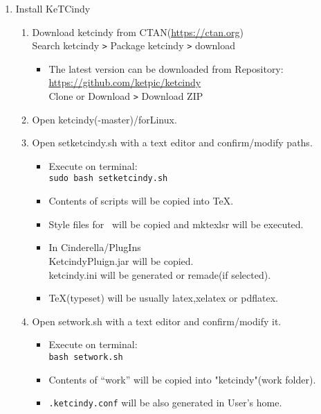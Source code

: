 \documentclass{article}
\begin{document}
\begin{enumerate}[\bf\large 1.]
\item Install KeTCindy
  \begin{enumerate}[(1)]
  \item Download ketcindy from CTAN(\url{https://ctan.org})\\
  \hspace*{10mm}Search ketcindy \verb|>| Pack­age ketcindy \verb|>| download
    \begin{itemize}
    \item The latest version can be downloaded from Repository:\\
        \hspace*{5mm}\url{https://github.com/ket­pic/ketcindy}\\
        \hspace*{10mm}Clone or Download \verb|>| Download ZIP
    \end{itemize}
  \item Open ketcindy(-master)/forLinux.
  \item Open setketcindy.sh with a text editor and confirm/modify paths.
    \begin{itemize}
    \item Execute on terminal:\\
    \hspace*{10mm}\verb|sudo bash setketcindy.sh|
    \item Contents of scripts will be copied into TeX.
    \item Style files for \ketcindy\ will be copied and mktexlsr will be executed.
    \item In Cinderella/PlugIns\\
    \hspace*{5mm}KetcindyPluign.jar will be copied.\\
    \hspace*{5mm}ketcindy.ini will be generated or remade(if selected).
    \item TeX(typeset) will be usually latex,xelatex or pdflatex.
    \end{itemize}
  \item Open setwork.sh with a text editor and confirm/modify it.
    \begin{itemize}
    \item Execute on terminal:\\
    \hspace*{10mm}\verb|bash setwork.sh|
    \item Contents of “work” will be copied into "ketcindy"(work folder).
    \item \verb|.ketcindy.conf| will be also generated in User's home.\\

\end{itemize}
\end{enumerate}
\end{enumerate}
\end{document}
